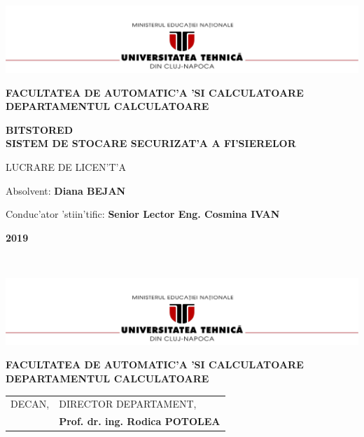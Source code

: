 \documentclass[12pt,a4paper,twoside]{report}
\renewcommand{\thesisauthor}{Diana BEJAN}    %
\renewcommand{\thesisyear}{2019}      %
\renewcommand{\thesistitle}{BITSTORED \\SISTEM DE STOCARE SECURIZAT'A A FI'SIERELOR} %
\renewcommand{\thesissupervisor}{ Senior Lector Eng. Cosmina IVAN}
\newcommand{\department}{FACULTATEA DE AUTOMATIC'A 'SI CALCULATOARE\\
DEPARTAMENTUL CALCULATOARE}
\newcommand{\thesis}{LUCRARE DE LICEN'T'A}
\newcommand{\utcnlogo}{\includegraphics[width=15cm]{img/utcn.jpg}}
\begin{document}

\newenvironment{definition}[1][Defini'tie.]{\begin{trivlist}
\item[\hskip \labelsep {\bfseries #1}]}{\end{trivlist}}








\begin{center}
\utcnlogo

{\bf \department}

\vspace{4cm}

{\bf \thesistitle} %

\vspace{1.5cm}

\thesis

\vspace{6cm}

Absolvent: {\bf \thesisauthor} 

Conduc'ator 'stiin'tific: {\bf \thesissupervisor}

\vspace{2cm}
{\bf \thesisyear}
\end{center}

\newpage
$ $
\newpage

\begin{center}
\utcnlogo

{\bf \department}
\end{center}
\vspace{0.5cm}

\begin{tabular}{p{7cm}p{8cm}}
 \hspace{-1cm}DECAN, & DIRECTOR DEPARTAMENT,\\
\hspace{-1cm}{\bf Prof. dr. ing. Liviu MICLEA} & {\bf Prof. dr. ing. Rodica POTOLEA}\\  
\end{tabular}
 
\vspace{1cm}
\end{document}
